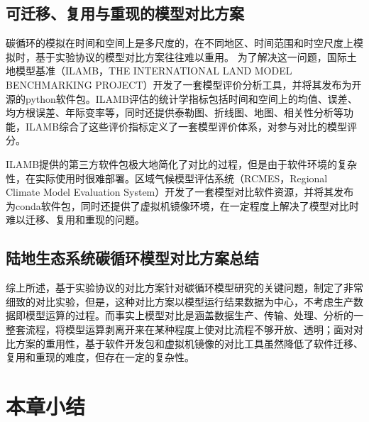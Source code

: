 \subsection{可迁移、复用与重现的模型对比方案}
碳循环的模拟在时间和空间上是多尺度的，在不同地区、时间范围和时空尺度上模拟时，基于实验协议的模型对比方案往往难以重用。
为了解决这一问题，国际土地模型基准（ILAMB，THE INTERNATIONAL LAND MODEL BENCHMARKING PROJECT）开发了一套模型评价分析工具，并将其发布为开源的python软件包。ILAMB评估的统计学指标包括时间和空间上的均值、误差、均方根误差、年际变率等，同时还提供泰勒图、折线图、地图、相关性分析等功能，ILAMB综合了这些评价指标定义了一套模型评价体系，对参与对比的模型评分。

ILAMB提供的第三方软件包极大地简化了对比的过程，但是由于软件环境的复杂性，在实际使用时很难部署。区域气候模型评估系统（RCMES，Regional Climate Model Evaluation System）开发了一套模型对比软件资源，并将其发布为conda软件包，同时还提供了虚拟机镜像环境，在一定程度上解决了模型对比时难以迁移、复用和重现的问题。

\subsection{陆地生态系统碳循环模型对比方案总结}

综上所述，基于实验协议的对比方案针对碳循环模型研究的关键问题，制定了非常细致的对比实验，但是，这种对比方案以模型运行结果数据为中心，不考虑生产数据即模型运算的过程。而事实上模型对比是涵盖数据生产、传输、处理、分析的一整套流程，将模型运算剥离开来在某种程度上使对比流程不够开放、透明；面对对比方案的重用性，基于软件开发包和虚拟机镜像的对比工具虽然降低了软件迁移、复用和重现的难度，但存在一定的复杂性。

\section{本章小结}
